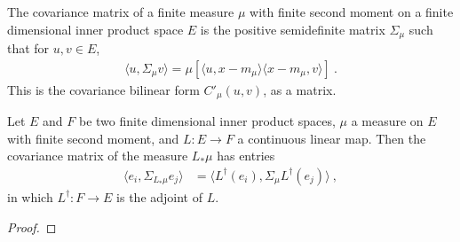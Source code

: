 \begin{definition}\label{def:covMatrix}
  \leanok
The covariance matrix of a finite measure $\mu$ with finite second moment on a finite dimensional inner product space $E$ is the positive semidefinite matrix $\Sigma_\mu$ such that for $u, v \in E$,
\begin{align*}
  \langle u, \Sigma_\mu v\rangle = \mu[\langle u, x - m_\mu \rangle \langle x - m_\mu, v \rangle] \: .
\end{align*}
This is the covariance bilinear form $C'_\mu(u, v)$, as a matrix.
\end{definition}


\begin{lemma}\label{lem:covMatrix_map}
Let $E$ and $F$ be two finite dimensional inner product spaces, $\mu$ a measure on $E$ with finite second moment, and $L : E \to F$ a continuous linear map.
Then the covariance matrix of the measure $L_*\mu$ has entries
\begin{align*}
  \langle e_i, \Sigma_{L_*\mu} e_j\rangle
  &= \langle L^\dagger(e_i), \Sigma_\mu L^\dagger(e_j)\rangle
  \: ,
\end{align*}
in which $L^\dagger : F \to E$ is the adjoint of $L$.
\end{lemma}

\begin{proof}

\end{proof}
